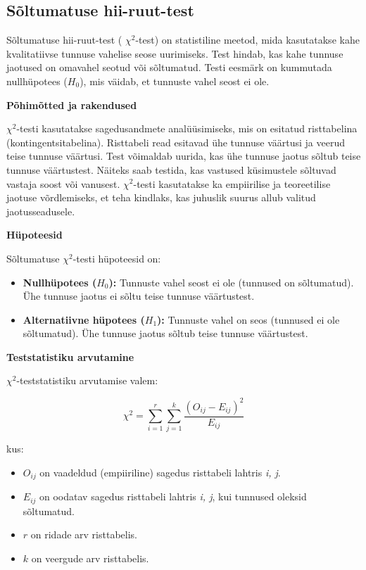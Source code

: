 \documentclass[
]{book}
\providecommand{\tightlist}{%
  \setlength{\itemsep}{0pt}\setlength{\parskip}{0pt}}
\theoremstyle{definition}
\theoremstyle{definition}
\theoremstyle{definition}
\theoremstyle{definition}
\theoremstyle{remark}
\begin{document}
\subsection{Sõltumatuse hii-ruut-test}\label{suxf5ltumatuse-hii-ruut-test}

Sõltumatuse hii-ruut-test ( \(\chi^2\)-test) on statistiline meetod, mida kasutatakse kahe kvalitatiivse tunnuse vahelise seose uurimiseks. Test hindab, kas kahe tunnuse jaotused on omavahel seotud või sõltumatud. Testi eesmärk on kummutada nullhüpotees (\(H_0\)), mis väidab, et tunnuste vahel seost ei ole.

\textbf{Põhimõtted ja rakendused}

\(\chi^2\)-testi kasutatakse sagedusandmete analüüsimiseks, mis on esitatud risttabelina (kontingentsitabelina). Risttabeli read esitavad ühe tunnuse väärtusi ja veerud teise tunnuse väärtusi. Test võimaldab uurida, kas ühe tunnuse jaotus sõltub teise tunnuse väärtustest. Näiteks saab testida, kas vastused küsimustele sõltuvad vastaja soost või vanusest. \(\chi^2\)-testi kasutatakse ka empiirilise ja teoreetilise jaotuse võrdlemiseks, et teha kindlaks, kas juhuslik suurus allub valitud jaotusseadusele.

\textbf{Hüpoteesid}

Sõltumatuse \(\chi^2\)-testi hüpoteesid on:

\begin{itemize}
\tightlist
\item
  \textbf{Nullhüpotees (\(H_0\)):} Tunnuste vahel seost ei ole (tunnused on sõltumatud). Ühe tunnuse jaotus ei sõltu teise tunnuse väärtustest.
\item
  \textbf{Alternatiivne hüpotees (\(H_1\)):} Tunnuste vahel on seos (tunnused ei ole sõltumatud). Ühe tunnuse jaotus sõltub teise tunnuse väärtustest.
\end{itemize}

\textbf{Teststatistiku arvutamine}

\(\chi^2\)-teststatistiku arvutamise valem:

\[
\chi^2 = \sum_{i=1}^{r} \sum_{j=1}^{k} \frac{(O_{ij} - E_{ij})^2}{E_{ij}}
\]

kus:

\begin{itemize}
\tightlist
\item
  \(O_{ij}\) on vaadeldud (empiiriline) sagedus risttabeli lahtris \emph{i, j}.
\item
  \(E_{ij}\) on oodatav sagedus risttabeli lahtris \emph{i, j}, kui tunnused oleksid sõltumatud.
\item
  \(r\) on ridade arv risttabelis.
\item
  \(k\) on veergude arv risttabelis.
\end{itemize}
\end{document}
